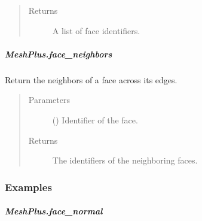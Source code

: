 \documentclass[letterpaper,10pt,english]{sphinxmanual}
\begin{document}
\begin{fulllineitems}
\begin{fulllineitems}
\begin{quote}
\begin{description}
\item[{Returns}] \leavevmode
{} \textendash{} A list of face identifiers.

\end{description}\end{quote}

\end{fulllineitems}



\subparagraph{MeshPlus.face\_neighbors}
\label{\detokenize{api/generated/directional_clustering.mesh.MeshPlus.face_neighbors:meshplus-face-neighbors}}\label{\detokenize{api/generated/directional_clustering.mesh.MeshPlus.face_neighbors::doc}}

\begin{fulllineitems}
\label{\detokenize{api/generated/directional_clustering.mesh.MeshPlus.face_neighbors:directional_clustering.mesh.MeshPlus.face_neighbors}}
Return the neighbors of a face across its edges.
\begin{quote}\begin{description}
\item[{Parameters}] \leavevmode
{} () \textendash{} Identifier of the face.

\item[{Returns}] \leavevmode
{} \textendash{} The identifiers of the neighboring faces.

\end{description}\end{quote}
\subsubsection*{Examples}

\begin{sphinxVerbatim}[commandchars=\\\{\}]
\end{sphinxVerbatim}

\end{fulllineitems}



\subparagraph{MeshPlus.face\_normal}
\label{\detokenize{api/generated/directional_clustering.mesh.MeshPlus.face_normal:meshplus-face-normal}}\label{\detokenize{api/generated/directional_clustering.mesh.MeshPlus.face_normal::doc}}


\end{fulllineitems}
\end{document}
